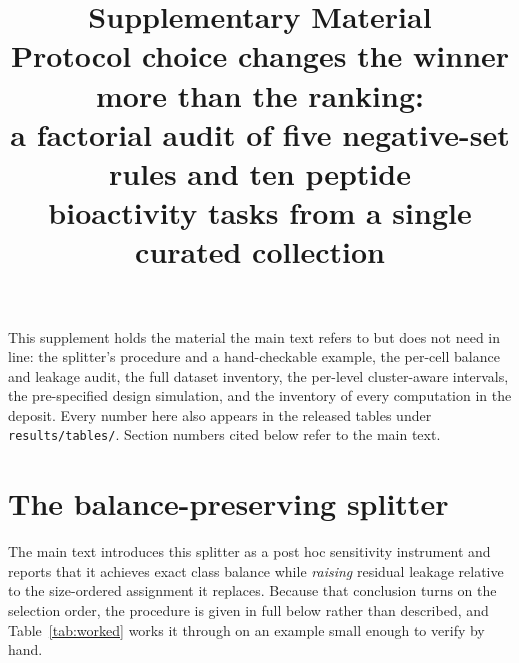 \documentclass[11pt,a4paper]{article}
\title{\bfseries Supplementary Material\\[2pt]
\large Protocol choice changes the winner more than the ranking:\\
a factorial audit of five negative-set rules and ten peptide\\
bioactivity tasks from a single curated collection}
\date{}
\begin{document}
\maketitle

\noindent This supplement holds the material the main text refers to but does not
need in line: the splitter's procedure and a hand-checkable example, the per-cell
balance and leakage audit, the full dataset inventory, the per-level
cluster-aware intervals, the pre-specified design simulation, and the inventory
of every computation in the deposit. Every number here also appears in the
released tables under \texttt{results/tables/}. Section numbers cited below refer
to the main text.

\section{The balance-preserving splitter}

The main text introduces this splitter as a post hoc sensitivity instrument and
reports that it achieves exact class balance while \emph{raising} residual
leakage relative to the size-ordered assignment it replaces. Because that
conclusion turns on the selection order, the procedure is given in full below
rather than described, and Table~\ref{tab:worked} works it through on an example
small enough to verify by hand.
\end{document}
